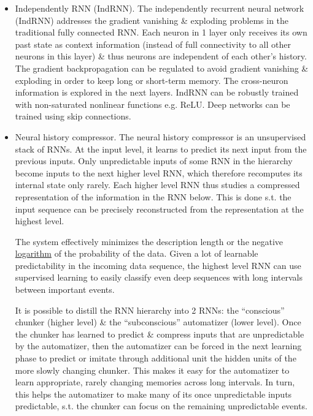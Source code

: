 \documentclass{article}
\begin{document}
\begin{itemize}
	\item {\sf Independently RNN (IndRNN).} The independently recurrent neural network (IndRNN) addresses the gradient vanishing \& exploding problems in the traditional fully connected RNN. Each neuron in 1 layer only receives its own past state as context information (instead of full connectivity to all other neurons in this layer) \& thus neurons are independent of each other's history. The gradient backpropagation can be regulated to avoid gradient vanishing \& exploding in order to keep long or short-term memory. The cross-neuron information is explored in the next layers. IndRNN can be robustly trained with non-saturated nonlinear functions e.g. ReLU. Deep networks can be trained using skip connections.
	\item {\sf Neural history compressor.} The neural history compressor is an unsupervised stack of RNNs. At the input level, it learns to predict its next input from the previous inputs. Only unpredictable inputs of some RNN in the hierarchy become inputs to the next higher level RNN, which therefore recomputes its internal state only rarely. Each higher level RNN thus studies a compressed representation of the information in the RNN below. This is done s.t. the input sequence can be precisely reconstructed from the representation at the highest level.
	
	The system effectively minimizes the description length or the negative \href{https://en.wikipedia.org/wiki/Logarithm}{logarithm} of the probability of the data. Given a lot of learnable predictability in the incoming data sequence, the highest level RNN can use supervised learning to easily classify even deep sequences with long intervals between important events.
	
	It is possible to distill the RNN hierarchy into 2 RNNs: the ``conscious'' chunker (higher level) \& the ``subconscious'' automatizer (lower level). Once the chunker has learned to predict \& compress inputs that are unpredictable by the automatizer, then the automatizer can be forced in the next learning phase to predict or imitate through additional unit the hidden units of the more slowly changing chunker. This makes it easy for the automatizer to learn appropriate, rarely changing memories across long intervals. In turn, this helps the automatizer to make many of its once unpredictable inputs predictable, s.t. the chunker can focus on the remaining unpredictable events.
	

\end{itemize}
\end{document}
